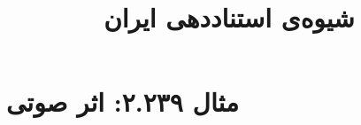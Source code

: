 \documentclass[a4paper,10pt]{article}
\begin{document}
\title{شیوه‌ی استناددهی ایران
 }
\author{}
\date{}
\maketitle



\section*{مثال ۲.۲۳۹: اثر صوتی}

\cite{شجریان1384}\\
\cite{anderson1992}\\






\end{document}
